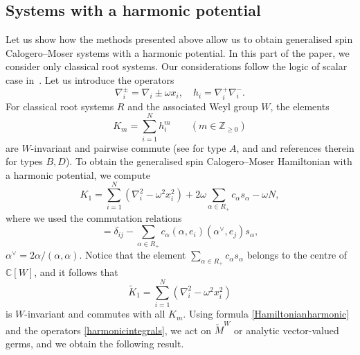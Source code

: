 \documentclass[12pt]{amsart}
\newcommand{\Z}{\mathbb Z}
\numberwithin{equation}{section}
\theoremstyle{definition}
\begin{document}
\subsection{Systems with a harmonic potential}
Let us show how the methods presented above allow us to obtain generalised
spin Calogero--Moser systems with a harmonic potential. In this part of the paper, we consider only classical root systems. Our considerations 
follow the logic of scalar case in~\cite{Feigin}. Let us introduce the operators
\begin{equation*}
    \nabla^{\pm}_i = \nabla_i \pm  \omega x_i, \quad h_i = \nabla_i^{+} \nabla_i^{-}.
\end{equation*}
For classical root systems $R$ and the associated Weyl group $W$, the elements 
\begin{equation} \label{harmonicintegrals}
    K_m = \sum\limits_{i = 1}^N h_i^m \qquad (m \in \Z_{\ge 0})
\end{equation}
are $W$-invariant and
pairwise commute (see \cite{Polych} for type $A$, and \cite{Feigin} and references therein for types $B, D$). To obtain the generalised spin Calogero--Moser Hamiltonian with a harmonic
potential, we compute
\begin{equation} \label{Hamiltonianharmonic}
    K_1 = \sum\limits_{i = 1}^N \left(\nabla_i^2 - \omega^2 x_i^2\right) + 
    2 \omega \sum\limits_{\alpha \in R_+} c_{\alpha} s_{\alpha} - \omega N,
\end{equation}
where we used the commutation relations
\begin{equation*}
    [\nabla_i, x_j] = \delta_{ij} - \sum\limits_{\alpha \in R_+} c_{\alpha}
    (\alpha, e_i) (\alpha^{\vee}, e_j)s_{\alpha},
\end{equation*}
$\alpha^\vee = 2\alpha/(\alpha, \alpha)$. Notice that the element $\sum_{\alpha \in R_+} c_{\alpha} s_{\alpha}$ belongs to the centre of $\mathbb{C}[W]$, and it follows that 
\begin{equation*}
    \widetilde{K}_1 = \sum\limits_{i = 1}^N \left(\nabla_i^2 - \omega^2 x_i^2\right)
\end{equation*}
is $W$-invariant and commutes with all $K_m$.
Using formula \eqref{Hamiltonianharmonic} and the operators \eqref{harmonicintegrals}, we act on $\widetilde{M}^W$ or analytic vector-valued germs, and we obtain 
the following result. 
\end{document}
